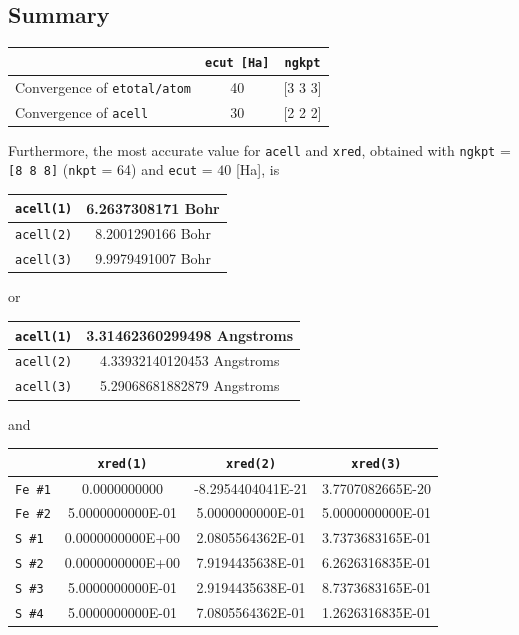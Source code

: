 \documentclass[11pt,a4paper]{article}
\begin{document}
\subsection{Summary}
\begin{center}
\begin{tabular}{|l|c|c|}
\cline{2-3}   
\multicolumn{1}{c|}{}&\texttt{ecut [Ha]} & \texttt{ngkpt} \\
\hline
\multirow{1}{*}{Convergence of \texttt{etotal/atom}} & 40 & [3 3 3]\\
\hline
\multirow{1}{*}{Convergence of \texttt{acell}} & 30 & [2 2 2]\\   
\hline           
\end{tabular}
\end{center}
Furthermore, the most accurate value for \texttt{acell} and \texttt{xred}, obtained with \texttt{ngkpt} = \texttt{[8 8 8]} (\texttt{nkpt} = 64) and \texttt{ecut} = $40$ [Ha], is 
\begin{center}
\begin{tabular}{|c|c|}
\hline 
\texttt{acell(1)} & 6.2637308171 Bohr\\
\hline
\texttt{acell(2)} & 8.2001290166 Bohr\\
\hline
\texttt{acell(3)} & 9.9979491007 Bohr\\
\hline
\end{tabular}
\end{center}
or
\begin{center}
\begin{tabular}{|c|c|}
\hline
\texttt{acell(1)} & 3.31462360299498 Angstroms\\
\hline
\texttt{acell(2)} & 4.33932140120453 Angstroms\\
\hline
\texttt{acell(3)} & 5.29068681882879 Angstroms\\
\hline
\end{tabular}
\end{center}
and
\begin{center}
\begin{tabular}{|l|c|c|c|}
\cline{2-4}
\multicolumn{1}{l|}{}&\texttt{xred(1)} & \texttt{xred(2)} & \texttt{xred(3)}\\
\hline
\texttt{Fe \#1} & 0.0000000000 & -8.2954404041E-21 & 3.7707082665E-20 \\
\hline
\texttt{Fe \#2} & 5.0000000000E-01 & 5.0000000000E-01 & 5.0000000000E-01\\
\hline
\texttt{S \#1} & 0.0000000000E+00 & 2.0805564362E-01 & 3.7373683165E-01\\
\hline
\texttt{S \#2} & 0.0000000000E+00 & 7.9194435638E-01 & 6.2626316835E-01\\
\hline
\texttt{S \#3} & 5.0000000000E-01 & 2.9194435638E-01 & 8.7373683165E-01\\
\hline
\texttt{S \#4} & 5.0000000000E-01 & 7.0805564362E-01 & 1.2626316835E-01\\
\hline
\end{tabular}
\end{center}
\end{document}
